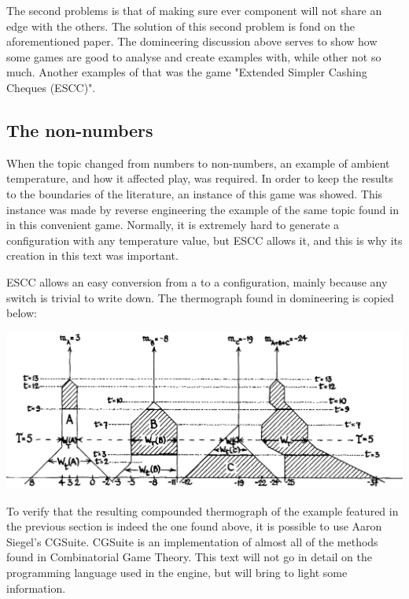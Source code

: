 The second problems is that of making sure ever component will not share an edge with the others. The solution of this second problem is fond on the aforementioned paper. The domineering discussion above serves to show how some games are good to analyse and create examples with, while other not so much. Another examples of that was the game "Extended Simpler Cashing Cheques (ESCC)". 

\subsection*{The non-numbers}

When the topic changed from numbers to non-numbers, an example of ambient temperature, and how it affected play, was required. In order to keep the results to the boundaries of the literature, an instance of this game was showed. This instance was made by reverse engineering the example of the same topic found in  in this convenient game. Normally, it is extremely hard to generate a configuration with any temperature value, but ESCC allows it, and this is why its creation in this text was important.

ESCC allows an easy conversion from a  to a configuration, mainly because any switch is trivial to write down. The thermograph found in domineering is copied below:

\vspace{0.5cm}\hspace{-3cm}\includegraphics[scale=0.5]{../images/cpd_therm_ww.png}
\vspace{0.5cm}

To verify that the resulting compounded thermograph of the example featured in the previous section is indeed the one found above, it is possible to use Aaron Siegel's CGSuite. CGSuite is an implementation of almost all of the methods found in Combinatorial Game Theory. This text will not go in detail on the programming language used in the engine, but will bring to light some information.

